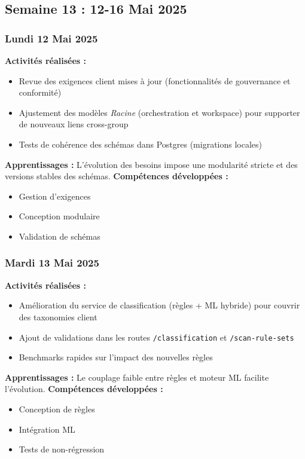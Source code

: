 \documentclass[12pt,a4paper]{article}
\begin{document}
\clearpage
\subsection{Semaine 13 : 12-16 Mai 2025}

\subsubsection{Lundi 12 Mai 2025}
\textbf{Activités réalisées :}
\begin{itemize}
    \item Revue des exigences client mises à jour (fonctionnalités de gouvernance et conformité)
    \item Ajustement des modèles \textit{Racine} (orchestration et workspace) pour supporter de nouveaux liens cross-group
    \item Tests de cohérence des schémas dans Postgres (migrations locales)
\end{itemize}
\textbf{Apprentissages :} L'évolution des besoins impose une modularité stricte et des versions stables des schémas.
\textbf{Compétences développées :}
\begin{itemize}
    \item Gestion d'exigences
    \item Conception modulaire
    \item Validation de schémas
\end{itemize}

\subsubsection{Mardi 13 Mai 2025}
\textbf{Activités réalisées :}
\begin{itemize}
    \item Amélioration du service de classification (règles + ML hybride) pour couvrir des taxonomies client
    \item Ajout de validations dans les routes \texttt{/classification} et \texttt{/scan-rule-sets}
    \item Benchmarks rapides sur l'impact des nouvelles règles
\end{itemize}
\textbf{Apprentissages :} Le couplage faible entre règles et moteur ML facilite l'évolution.
\textbf{Compétences développées :}
\begin{itemize}
    \item Conception de règles
    \item Intégration ML
    \item Tests de non-régression
\end{itemize}
\end{document}
